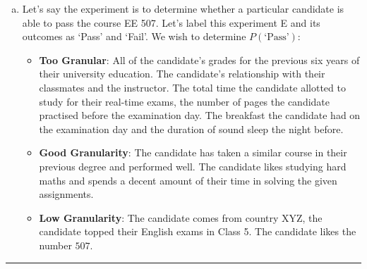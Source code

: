 \begin{enumerate}[a.]
	\item Let's say the experiment is to determine whether a particular candidate is able to pass the course EE 507. Let's label this experiment E and its outcomes as `Pass' and `Fail'. We wish to determine $P(\text{`Pass'})$:
		\begin{itemize}
			\item \textbf{Too Granular}: All of the candidate's grades for the previous six years of their university education. The candidate's relationship with their classmates and the instructor. The total time the candidate allotted to study for their real-time exams, the number of pages the candidate practised before the examination day. The breakfast the candidate had on the examination day and the duration of sound sleep the night before.
			\item \textbf{Good Granularity}: The candidate has taken a similar course in their previous degree and performed well. The candidate likes studying hard maths and spends a decent amount of their time in solving the given assignments.
			\item \textbf{Low Granularity}: The candidate comes from country XYZ, the candidate topped their English exams in Class 5. The candidate likes the number $507$.
		\end{itemize}
\end{enumerate}

\noindent\rule{\textwidth}{1pt}